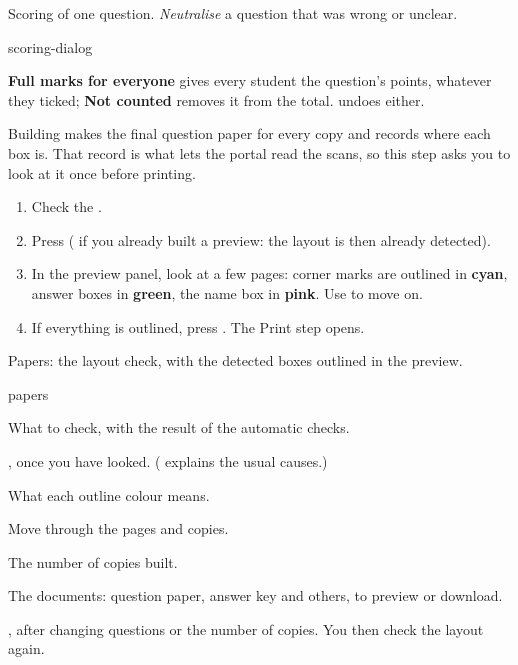 \documentclass[11pt]{article}
\begin{document}
\begin{guidefig}{Scoring of one question. \emph{Neutralise} a question that was wrong or unclear.}
\begin{shot}[0.5\linewidth]{scoring-dialog}
\end{shot}
\end{guidefig}

\textbf{Full marks for everyone} gives every student the question's points, whatever they ticked; \textbf{Not counted} removes it from the total.  undoes either.

\label{step:papers}

Building makes the final question paper for every copy and records where each box is. That record is what lets the portal read the scans, so this step asks you to look at it once before printing.

\begin{enumerate}
  \item Check the .
  \item Press  ( if you already built a preview: the layout is then already detected).
  \item In the preview panel, look at a few pages: corner marks are outlined in \textbf{cyan}, answer boxes in \textbf{green}, the name box in \textbf{pink}. Use  to move on.
  \item If everything is outlined, press . The Print step opens.
\end{enumerate}

\begin{keep}
\begin{guidefig}{Papers: the layout check, with the detected boxes outlined in the preview.}
\begin{shot}{papers}
\end{shot}
\end{guidefig}
\begin{callouts}
  \item What to check, with the result of the automatic checks.
  \item {}, once you have looked. ( explains the usual causes.)
  \item What each outline colour means.
  \item Move through the pages and copies.
  \item The number of copies built.
  \item The documents: question paper, answer key and others, to preview or download.
  \item {}, after changing questions or the number of copies. You then check the layout again.
\end{callouts}
\end{keep}
\end{document}
